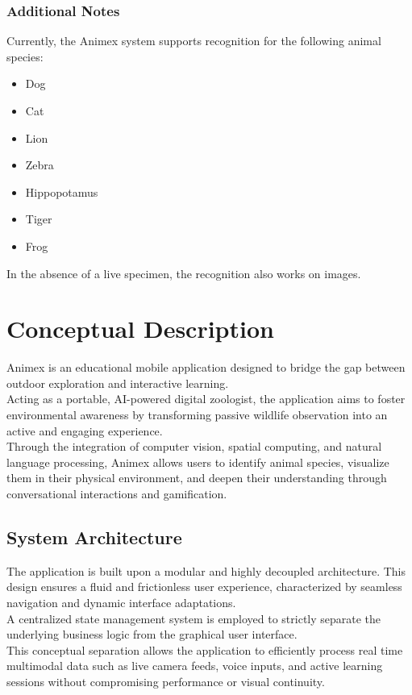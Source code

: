 \documentclass{article}
\begin{document}
\subsubsection{Additional Notes}
Currently, the Animex system supports recognition for the following animal species:
\begin{itemize}
    \item Dog
    \item Cat
    \item Lion
    \item Zebra
    \item Hippopotamus
    \item Tiger
    \item Frog
\end{itemize}
In the absence of a live specimen, the recognition also works on images.

\clearpage
\section{Conceptual Description}
Animex is an educational mobile application designed to bridge the gap between outdoor exploration and interactive learning.\\
Acting as a portable, AI-powered digital zoologist, the application aims to foster environmental awareness by transforming passive wildlife observation into an active and engaging experience.\\ 
Through the integration of computer vision, spatial computing, and natural language processing, Animex allows users to identify animal species, visualize them in their physical environment, and deepen their understanding through conversational interactions and gamification.
\subsection{System Architecture}
The application is built upon a modular and highly decoupled architecture. This design ensures a fluid and frictionless user experience, characterized by seamless navigation and dynamic interface adaptations.\\
A centralized state management system is employed to strictly separate the underlying business logic from the graphical user interface.\\ 
This conceptual separation allows the application to efficiently process real time multimodal data such as live camera feeds, voice inputs, and active learning sessions without compromising performance or visual continuity.
\end{document}
